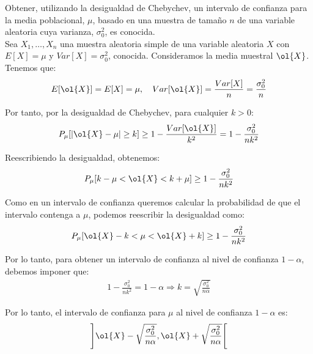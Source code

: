 \begin{ejemplo}\label{ejemplo:chebychev}
    Obtener, utilizando la desigualdad de Chebychev, un intervalo de confianza para la media poblacional, $\mu$, basado en una muestra de tamaño $n$ de una variable aleatoria cuya varianza, $\sigma^2_0$, es conocida.\\

    Sea $X_1, \ldots, X_n$ una muestra aleatoria simple de una variable aleatoria $X$ con $E[X] = \mu$ y $Var[X] = \sigma^2_0$, conocida. Consideramos la media muestral $\ol{X}$. Tenemos que:
    \begin{align*}
        E[\ol{X}] = E[X] = \mu, \quad Var[\ol{X}] = \frac{Var[X]}{n} = \frac{\sigma^2_0}{n}
    \end{align*}

    Por tanto, por la desigualdad de Chebychev, para cualquier $k > 0$:
    \begin{align*}
        P_\mu[|\ol{X} - \mu| \geq k]\geq 1-  \frac{Var[\ol{X}]}{k^2} = 1-\frac{\sigma^2_0}{n k^2}
    \end{align*}

    Reescribiendo la desigualdad, obtenemos:
    \begin{align*}
        P_\mu[k-\mu < \ol{X} < k+\mu] \geq 1 - \frac{\sigma^2_0}{n k^2}
    \end{align*}

    Como en un intervalo de confianza queremos calcular la probabilidad de que el intervalo contenga a $\mu$, podemos reescribir la desigualdad como:
    \begin{align*}
        P_\mu[\ol{X} - k < \mu < \ol{X} + k] \geq 1 - \frac{\sigma^2_0}{n k^2}
    \end{align*}

    Por lo tanto, para obtener un intervalo de confianza al nivel de confianza $1 - \alpha$, debemos imponer que:
    \begin{align*}
        1 - \frac{\sigma^2_0}{n k^2} = 1 - \alpha \Longrightarrow k = \sqrt{\frac{\sigma^2_0}{n \alpha}}
    \end{align*}

    Por lo tanto, el intervalo de confianza para $\mu$ al nivel de confianza $1 - \alpha$ es:
    \begin{align*}
        \left]\ol{X} - \sqrt{\frac{\sigma^2_0}{n \alpha}}, \ol{X} + \sqrt{\frac{\sigma^2_0}{n \alpha}}\right[
    \end{align*}
\end{ejemplo}


